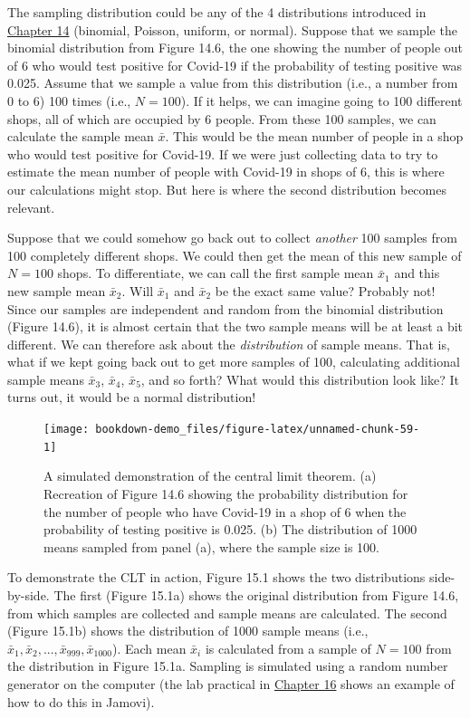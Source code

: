 \documentclass[
]{scrbook}
\begin{document}
The sampling distribution could be any of the 4 distributions introduced in \protect\hyperlink{Chapter_14}{Chapter 14} (binomial, Poisson, uniform, or normal).
Suppose that we sample the binomial distribution from Figure 14.6, the one showing the number of people out of 6 who would test positive for Covid-19 if the probability of testing positive was 0.025.
Assume that we sample a value from this distribution (i.e., a number from 0 to 6) 100 times (i.e., \(N = 100\)).
If it helps, we can imagine going to 100 different shops, all of which are occupied by 6 people.
From these 100 samples, we can calculate the sample mean \(\bar{x}\).
This would be the mean number of people in a shop who would test positive for Covid-19.
If we were just collecting data to try to estimate the mean number of people with Covid-19 in shops of 6, this is where our calculations might stop.
But here is where the second distribution becomes relevant.

Suppose that we could somehow go back out to collect \emph{another} 100 samples from 100 completely different shops.
We could then get the mean of this new sample of \(N = 100\) shops.
To differentiate, we can call the first sample mean \(\bar{x}_{1}\) and this new sample mean \(\bar{x}_{2}\).
Will \(\bar{x}_{1}\) and \(\bar{x}_{2}\) be the exact same value?
Probably not!
Since our samples are independent and random from the binomial distribution (Figure 14.6), it is almost certain that the two sample means will be at least a bit different.
We can therefore ask about the \emph{distribution} of sample means.
That is, what if we kept going back out to get more samples of 100, calculating additional sample means \(\bar{x}_{3}\), \(\bar{x}_{4}\), \(\bar{x}_{5}\), and so forth?
What would this distribution look like?
It turns out, it would be a normal distribution!

\begin{figure}
\texttt{[image: bookdown-demo\_files/figure-latex/unnamed-chunk-59-1]} \caption{A simulated demonstration of the central limit theorem. (a) Recreation of Figure 14.6 showing the probability distribution for the number of people who have Covid-19 in a shop of 6 when the probability of testing positive is 0.025. (b) The distribution of 1000 means sampled from panel (a), where the sample size is 100.}\label{fig:unnamed-chunk-59}
\end{figure}

To demonstrate the CLT in action, Figure 15.1 shows the two distributions side-by-side.
The first (Figure 15.1a) shows the original distribution from Figure 14.6, from which samples are collected and sample means are calculated.
The second (Figure 15.1b) shows the distribution of 1000 sample means (i.e., \(\bar{x}_{1}, \bar{x}_{2}, ..., \bar{x}_{999}, \bar{x}_{1000}\)).
Each mean \(\bar{x}_{i}\) is calculated from a sample of \(N = 100\) from the distribution in Figure 15.1a.
Sampling is simulated using a random number generator on the computer (the lab practical in \protect\hyperlink{Chapter_16}{Chapter 16} shows an example of how to do this in Jamovi).
\end{document}
